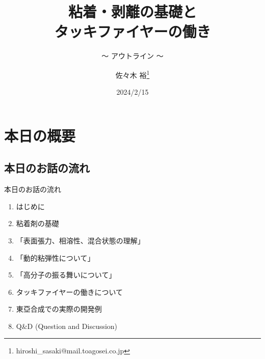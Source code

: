\documentclass[unicode,12pt]{beamer}%
\title{粘着・剥離の基礎と\\タッキファイヤーの働き}
\subtitle{～ アウトライン ～}
\author[東亞合成 佐々木]{佐々木 裕\thanks{hiroshi\_sasaki@mail.toagosei.co.jp}}
\institute[東亞合成]{東亞合成株式会社}
\date{2024/2/15}
\begin{document}
\maketitle

\section{本日の概要}
\subsection{本日のお話の流れ}
\large
\begin{frame}{本日のお話の流れ}
    \begin{enumerate}
        \item はじめに
        \item 粘着剤の基礎
            \item 「表面張力、相溶性、混合状態の理解」
            \item 「動的粘弾性について」
            \item 「高分子の振る舞いについて」
        \item タッキファイヤーの働きについて
        \item 東亞合成での実際の開発例
        \item Q\&D (Question and Discussion)
    \end{enumerate}
\end{frame} 
\end{document}
